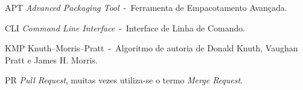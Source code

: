 \begin{siglas}
  \item[APT] \textit{Advanced Packaging Tool}~-~Ferramenta de Empacotamento Avançada.
  \item [CLI] \textit{Command Line Interface}~-~Interface de Linha de Comando.
  \item [KMP] Knuth–Morris–Pratt~-~Algoritmo de autoria de Donald Knuth, Vaughan Pratt e James H. Morris.
  \item [PR] \textit{Pull Request}, muitas vezes utiliza-se o termo \textit{Merge Request}.
\end{siglas}
